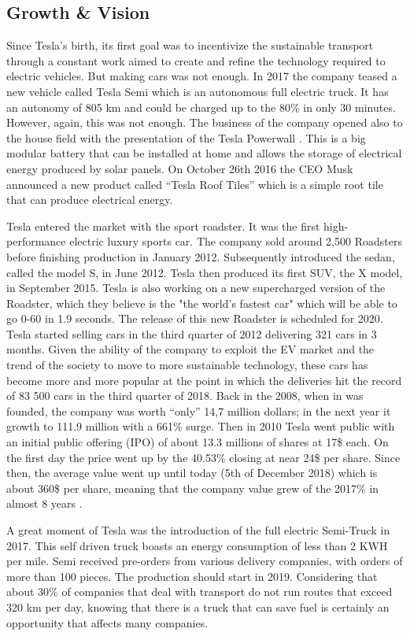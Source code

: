 \subsection{Growth & Vision}
Since Tesla's birth, its first goal was to incentivize the sustainable transport through a constant work aimed to create and refine the technology required to electric vehicles. But making cars was not enough. In 2017 the company teased a new vehicle called Tesla Semi which is an autonomous full electric truck. It has an autonomy of 805 km and could be charged up to the 80\% in only 30 minutes.
However, again, this was not enough. The business of the company opened also to the house field with the presentation of the Tesla Powerwall \cite{Powerwall}. This is a big modular battery that can be installed at home and allows the storage of electrical energy produced by solar panels. On October 26th 2016 the CEO Musk announced a new product called “Tesla Roof Tiles” which is a simple root tile that can produce electrical energy.

Tesla entered the market with the sport roadster. It was the first high-performance electric luxury sports car. The company sold around 2,500 Roadsters before finishing production in January 2012.
Subsequently introduced the sedan, called the model S, in June 2012. Tesla then produced its first SUV, the X model, in September 2015. Tesla is also working on a new supercharged version of the Roadster, which they believe is the "the world's fastest car" which will be able to go 0-60 in 1.9 seconds. The release of this new Roadster is scheduled for 2020.
Tesla started selling cars in the third quarter of 2012 delivering 321 cars in 3 months. Given the ability of the company to exploit the EV market and the trend of the society to move to more sustainable technology, these cars has become more and more popular at the point in which the deliveries hit the record of 83 500 cars in the third quarter of 2018.
Back in the 2008, when in was founded, the company was worth “only” 14,7 million dollars; in the next year it growth to 111.9 million with a 661\% surge. Then in 2010 Tesla went public with an initial public offering (IPO) of about 13.3 millions of shares at 17\$ each. On the first day the price went up by the 40.53\% closing at near 24\$ per share. Since then, the average value went up until today (5th of December 2018) which is about 360\$ per share, meaning that the company value grew of the 2017\% in almost 8 years \cite{Growth}.

A great moment of Tesla was the introduction of the full electric Semi-Truck in 2017. This self driven truck boasts an energy consumption of less than 2 KWH per mile. Semi received pre-orders from various delivery companies, with orders of more than 100 pieces. The production should start in 2019. Considering that about 30\% of companies that deal with transport do not run routes that exceed 320 km per day, knowing that there is a truck that can save fuel is certainly an opportunity that affects many companies.

